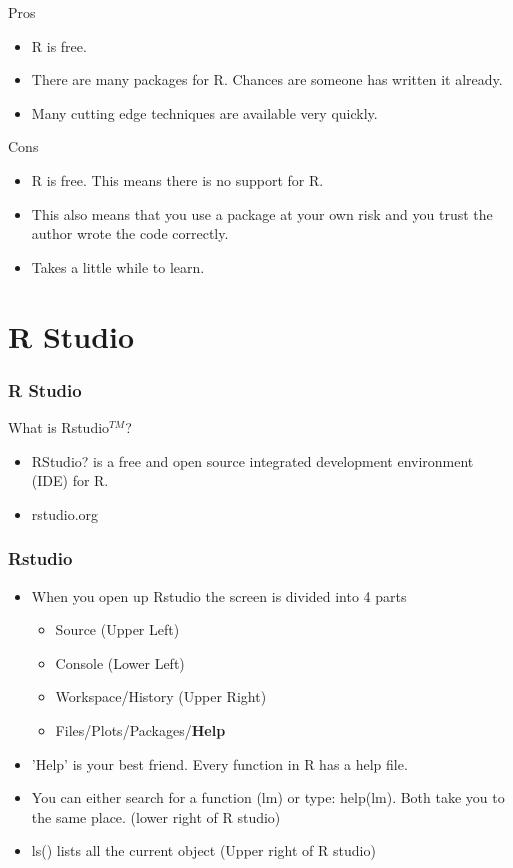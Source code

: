 \begin{frame}
Pros
\begin{itemize}
\item R is free.
\item There are many packages for R.  Chances are someone has written it already. 
\item Many cutting edge techniques are available very quickly.  
\end{itemize}
\end{frame}


\begin{frame}
Cons
\begin{itemize}
\item R is free.  This means there is no support for R.  
\item This also means that you use a package at your own risk and you trust the author wrote the code correctly.  
\item Takes a little while to learn.
\end{itemize}
\end{frame}



\section{R Studio}
\begin{frame}
\frametitle{R Studio}
What is Rstudio$^{TM}$?
\begin{itemize}
\item RStudio? is a free and open source integrated development environment (IDE) for R.
\item rstudio.org
\end{itemize}
\end{frame}


\begin{frame}
\frametitle{Rstudio}
\begin{itemize}
\item When you open up Rstudio the screen is divided into 4 parts
\begin{itemize}
\item Source (Upper Left)
\item Console (Lower Left)
\item Workspace/History (Upper Right)
\item Files/Plots/Packages/{\bf Help}
\end{itemize}
\item 'Help' is your best friend. Every function in R has a help file.  
\item You can either search for a function (lm) or type: help(lm).  Both take you to the same place.  (lower right of R studio)
\item ls() lists all the current object (Upper right of R studio)
\end{itemize}
\end{frame}



